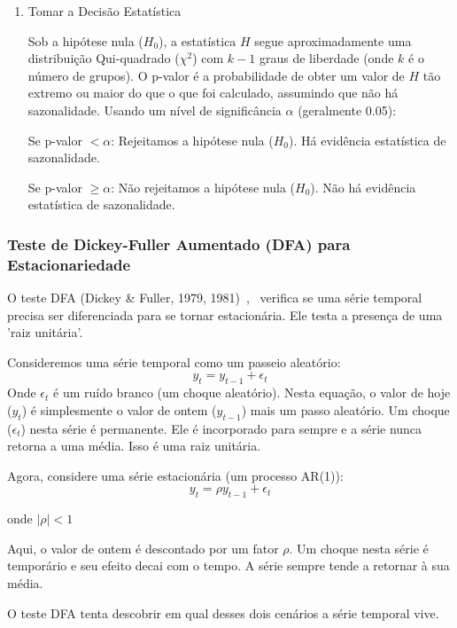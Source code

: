 \documentclass[ 12pt,a4paper ]{article} %
\begin{document}
\begin{itemize}
\begin{enumerate}
\begin{itemize}
		\end{itemize}
		
		\item Tomar a Decisão Estatística
		
		Sob a hipótese nula ($H_0$), a estatística $H$ segue aproximadamente uma distribuição Qui-quadrado ($\chi^2$) com $k-1$ graus de liberdade (onde $k$ é o número de grupos).
		O p-valor é a probabilidade de obter um valor de $H$ tão extremo ou maior do que o que foi calculado, assumindo que não há sazonalidade.
		Usando um nível de significância $\alpha$ (geralmente 0.05):
		
		Se p-valor  $ <\alpha$: Rejeitamos a hipótese nula ($H_0$). Há evidência estatística de sazonalidade.
		
		Se p-valor $\geq \alpha$: Não rejeitamos a hipótese nula ($H_0$). Não há evidência estatística de sazonalidade.
		
	\end{enumerate}
\end{itemize}
	
	\subsubsection{Teste de Dickey-Fuller Aumentado (DFA) para Estacionariedade}
	
	O teste DFA (Dickey \& Fuller, 1979, 1981)~\cite{Dickey1},~\cite{Dickey2} verifica se uma série temporal precisa ser diferenciada para se tornar estacionária. Ele testa a presença de uma 'raiz unitária'.
	
	Consideremos uma série temporal como um passeio aleatório:
	$$y_t=y_{t-1} + \epsilon_t$$
	Onde $\epsilon_t$ é um ruído branco (um choque aleatório). Nesta equação, o valor de hoje ($y_t$) é simplesmente o valor de ontem ($y_{t-1}$) mais um passo aleatório. Um choque ($\epsilon_t$) nesta série é permanente. Ele é incorporado para sempre e a série nunca retorna a uma média. Isso é uma raiz unitária.
	
	Agora, considere uma série estacionária (um processo AR(1)):
		$$y_t= \rho y_{t-1} + \epsilon_t$$

	onde $|\rho |<1$
	
	Aqui, o valor de ontem é descontado por um fator $\rho$. Um choque nesta série é temporário e seu efeito decai com o tempo. A série sempre tende a retornar à sua média.
	
	O teste DFA tenta descobrir em qual desses dois cenários a série temporal vive.
	
\end{document}
